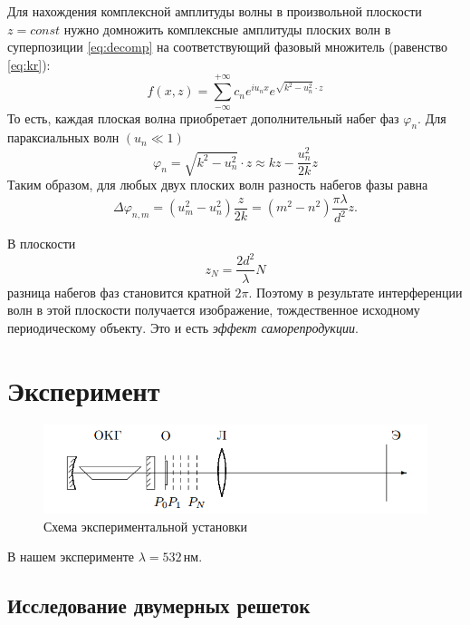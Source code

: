 \documentclass[a4paper, 12pt]{article}
\begin{document}
	Для нахождения комплексной амплитуды волны в произвольной плоскости $z = const$ нужно домножить комплексные амплитуды плоских волн в суперпозиции \eqref{eq:decomp} на соответствующий фазовый множитель (равенство \eqref{eq:kr}):
	\begin{equation}\label{eq:to_zz}
		f(x, z) = \sum\limits_{-\infty}^{+\infty} c_ne^{iu_nx}e^{\sqrt{k^2 - u_n^2}\cdot z}
	\end{equation}
	То есть, каждая плоская волна приобретает дополнительный набег фаз $\varphi_n$. Для параксиальных волн $(u_n \ll 1)$
	\begin{equation}\label{eq:parax}
		\varphi_n = \sqrt{k^2 - u_n^2}\cdot z \approx kz - \frac{u_n^2}{2k}z
	\end{equation}
	Таким образом, для любых двух плоских волн разность набегов фазы равна
	\begin{equation}\label{eq:phase}
		\Delta\varphi_{n, m} = (u_m^2 - u_n^2)\frac{z}{2k} = (m^2 - n^2)\frac{\pi\lambda}{d^2}z.
	\end{equation}
	
	В плоскости
	\begin{equation}\label{eq:end_formula}
		z_N = \frac{2d^2}{\lambda}N
	\end{equation}
	разница набегов фаз становится кратной $2\pi$. Поэтому в результате интерференции волн в этой плоскости получается изображение, тождественное исходному периодическому объекту. Это и есть \textit{эффект саморепродукции}.
	
	\section{Эксперимент}
	
	\begin{figure}[h!]\label{fig:scheme}
		\begin{center}
			\includegraphics[scale=0.8]{scheme}
			\caption{Схема экспериментальной установки}
		\end{center}
	\end{figure}

	В нашем эксперименте $\lambda = 532\,\text{нм}$.
	
	\subsection{Исследование двумерных решеток}
	
\end{document}
